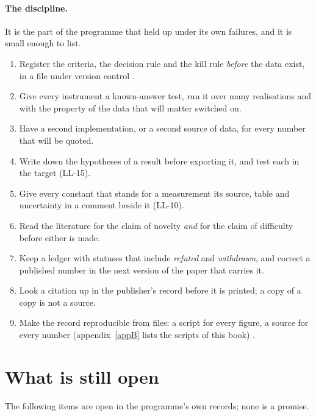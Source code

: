 \paragraph{The discipline.} It is the part of the programme that held up under its own failures, and it is small enough to list.
\begin{keybox}
\begin{enumerate}[nosep,label=\arabic*.]
\item Register the criteria, the decision rule and the kill rule \emph{before} the data exist, in a file under version control \cite{Nosek2018}.
\item Give every instrument a known-answer test, run it over many realisations and with the property of the data that will matter switched on.
\item Have a second implementation, or a second source of data, for every number that will be quoted.
\item Write down the hypotheses of a result before exporting it, and test each in the target (LL-15).
\item Give every constant that stands for a measurement its source, table and uncertainty in a comment beside it (LL-10).
\item Read the literature for the claim of novelty \emph{and} for the claim of difficulty before either is made.
\item Keep a ledger with statuses that include \emph{refuted} and \emph{withdrawn}, and correct a published number in the next version of the paper that
 carries it.
\item Look a citation up in the publisher's record before it is printed; a copy of a copy is not a source.
\item Make the record reproducible from files: a script for every figure, a source for every number (appendix~\ref{appB} lists the scripts of this book) \cite{Peng2011}.
\end{enumerate}
\end{keybox}

\section{What is still open}\label{ch10:sec-open}

The following items are open in the programme's own records; none is a promise.

